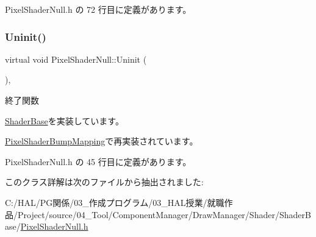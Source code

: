  Pixel\+Shader\+Null.\+h の 72 行目に定義があります。

\mbox{\label{class_pixel_shader_null_ae5ee2fa95e5da787918ccbd1877cd0ef}} 
\subsubsection{\texorpdfstring{Uninit()}{Uninit()}}
{\footnotesize\ttfamily virtual void Pixel\+Shader\+Null\+::\+Uninit (\begin{DoxyParamCaption}{ }\end{DoxyParamCaption})\hspace{0.3cm}{\ttfamily [inline]}, {\ttfamily [virtual]}}



終了関数 



\mbox{\hyperlink{class_shader_base_a784edfa81bec4d08a257ed4f02c61222}{Shader\+Base}}を実装しています。



\mbox{\hyperlink{class_pixel_shader_bump_mapping_a004f731db6dab6b59949baed4a5a32d7}{Pixel\+Shader\+Bump\+Mapping}}で再実装されています。



 Pixel\+Shader\+Null.\+h の 45 行目に定義があります。



このクラス詳解は次のファイルから抽出されました\+:\begin{DoxyCompactItemize}
\item 
C\+:/\+H\+A\+L/\+P\+G関係/03\+\_\+作成プログラム/03\+\_\+\+H\+A\+L授業/就職作品/\+Project/source/04\+\_\+\+Tool/\+Component\+Manager/\+Draw\+Manager/\+Shader/\+Shader\+Base/\mbox{\hyperlink{_pixel_shader_null_8h}{Pixel\+Shader\+Null.\+h}}\end{DoxyCompactItemize}

